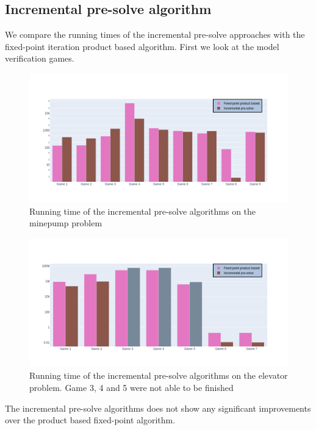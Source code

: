 \subsection{Incremental pre-solve algorithm}
We compare the running times of the incremental pre-solve approaches with the fixed-point iteration product based algorithm. First we look at the model verification games.
\begin{figure}[H]
	\includegraphics[width=1\linewidth]{"results/minepump/Fixed-point product based_Incremental pre-solve_"}
	\caption{Running time of the incremental pre-solve algorithms on the minepump problem}
	\label{fig:minepumpzlnks}
\end{figure}%
\begin{figure}[H]
	\includegraphics[width=1\linewidth]{"results/elevator/Fixed-point product based_Incremental pre-solve_"}
	\caption{Running time of the incremental pre-solve algorithms on the elevator problem. Game 3, 4 and 5 were not able to be finished }
	\label{fig:elevatorzlnks}
\end{figure}%
The incremental pre-solve algorithms does not show any significant improvements over the product based fixed-point algorithm.

